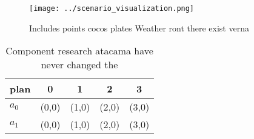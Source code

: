 \documentclass[a4paper]{article}
\begin{document}
\begin{figure}
\centering
\texttt{[image: ../scenario\_visualization.png]}
\caption{Includes points cocos plates Weather ront there exist verna
}
\end{figure}
 
\begin{table}
\begin{adjustbox}{width=0.7\columnwidth}
\begin{tabular}{|l|l|l|l|l|}
\hline
\textbf{plan} & \multicolumn{1}{c|}{\textbf{0}} & \multicolumn{1}{c|}{\textbf{1}} & \multicolumn{1}{c|}{\textbf{2}} & \multicolumn{1}{c|}{\textbf{3}} \\ \hline
\textbf{$a_0$}  & (0,0) & (1,0) & (2,0) & (3,0) \\ \hline
\textbf{$a_1$}  & (0,0) & (1,0) & (2,0) & (3,0) \\ \hline
\end{tabular}
\end{adjustbox}
\caption{Component research atacama have never changed the
}
\end{table}
\end{document}
